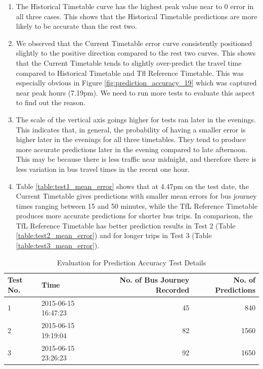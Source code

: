 \begin{enumerate}
  \item The Historical Timetable curve has the highest peak value near to 0 error in all three cases. This shows that the Historical Timetable predictions are more likely to be accurate than the rest two.
  \item We observed that the Current Timetable error curve consistently positioned slightly to the positive direction compared to the rest two curves. This shows that the Current Timetable tends to slightly over-predict the travel time compared to Historical Timetable and Tfl Reference Timetable. This was especially obvious in Figure \ref{fig:prediction_accuracy_19} which was captured near peak hours (7.19pm). We need to run more tests to evaluate this aspect to find out the reason.
  \item The scale of the vertical axis goings higher for tests ran later in the evenings. This indicates that, in general, the probability of having a smaller error is higher later in the evenings for all three timetables. They tend to produce more accurate predictions later in the evening compared to late afternoon. This may be because there is less traffic near midnight, and therefore there is less variation in bus travel times in the recent one hour.
  \item Table \ref{table:test1_mean_error} shows that at 4.47pm on the test date, the Current Timetable gives predictions with smaller mean errors for bus journey times ranging between 15 and 50 minutes, while the TfL Reference Timetable produces more accurate predictions for shorter bus trips. In comparison, the TfL Reference Timetable has better prediction results in Test 2 (Table \ref{table:test2_mean_error}) and for longer trips in Test 3 (Table \ref{table:test3_mean_error}).
\end{enumerate}

\begin{table}
\centering
\begin{tabular}{@{}llrr@{}} \toprule
Test No. & Time & No. of Bus Journey Recorded & No. of Predictions\\ \midrule
1 & 2015-06-15 16:47:23 & 45 & 840 \\
2 & 2015-06-15 19:19:04 & 82 & 1560\\
3 & 2015-06-15 23:26:23 & 92 & 1650\\
\bottomrule
\end{tabular}
\caption{Evaluation for Prediction Accuracy Test Details}
\label{table:test_details}
\end{table}

